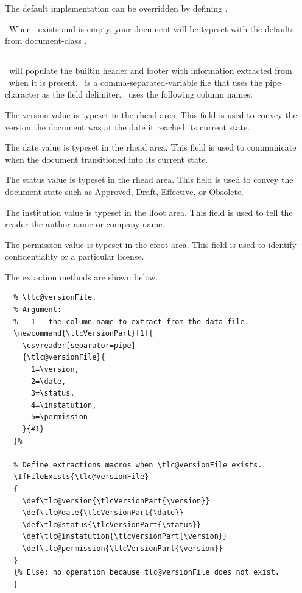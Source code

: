 \documentclass[12pt]{tlc-article}
\begin{document}
The default implementation can be overridden by defining \tlcHF. 

\tlcNote\ When \tlcHF\ exists and is empty, your document will be typeset
with the defaults from document-class .


\clearpage
\subsection{\tlcVE} \label{sec:version}
\tlcA\ will populate the builtin header and footer with information extracted
from \tlcVE\ when it is present.  \tlcVE\ is a comma-separated-variable file
that uses the pipe character as the field delimiter.  \tlcVE\ uses the following
column names:

\begin{description}[style=nextline]
  \item[version] The version value is typeset in the rhead area.  This field is
    used to convey the version the document was at the date it reached its
    current state.

  \item[date] The date value is typeset in the rhead area.  This field is used
    to communicate when the document transitioned into its current state.

  \item[status] The status value is typeset in the rhead area.  This field is
    used to convey the document state such as Approved, Draft, Effective, or
    Obsolete.

  \item[instatution] The institution value is typeset in the lfoot area.  This
    field is used to tell the reader the author name or company name.

  \item[permission]  The permission value is typeset in the cfoot area.  This
    field is used to identify confidentiality or a particular license. 

\end{description}

The extaction methods are shown below.
\begin{lstlisting}[basicstyle=\tiny]
  % Extract document status, document date and document version from
  % \tlc@versionFile.
  % Argument:
  %   1 - the column name to extract from the data file.
  \newcommand{\tlcVersionPart}[1]{
    \csvreader[separator=pipe]
    {\tlc@versionFile}{
      1=\version,
      2=\date,
      3=\status,
      4=\instatution,
      5=\permission
    }{#1}
  }%

  % Define extractions macros when \tlc@versionFile exists.
  \IfFileExists{\tlc@versionFile}
  { 
    \def\tlc@version{\tlcVersionPart{\version}}
    \def\tlc@date{\tlcVersionPart{\date}}
    \def\tlc@status{\tlcVersionPart{\status}}
    \def\tlc@instatution{\tlcVersionPart{\version}}
    \def\tlc@permission{\tlcVersionPart{\version}}
  }
  {% Else: no operation because tlc@versionFile does not exist. 
  }
\end{lstlisting}
\end{document}
